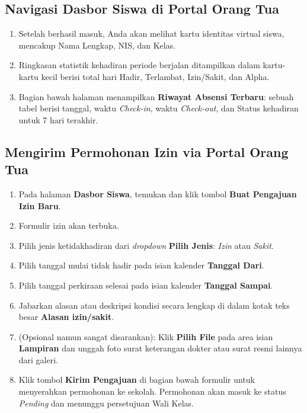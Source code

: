 \subsection{Navigasi Dasbor Siswa di Portal Orang Tua}
\begin{enumerate}
    \item Setelah berhasil masuk, Anda akan melihat kartu identitas virtual siswa, mencakup Nama Lengkap, NIS, dan Kelas.
    \item Ringkasan statistik kehadiran periode berjalan ditampilkan dalam kartu-kartu kecil berisi total hari Hadir, Terlambat, Izin/Sakit, dan Alpha.
    \item Bagian bawah halaman menampilkan \textbf{Riwayat Absensi Terbaru}: sebuah tabel berisi tanggal, waktu \textit{Check-in}, waktu \textit{Check-out}, dan Status kehadiran untuk 7 hari terakhir.
\end{enumerate}

\subsection{Mengirim Permohonan Izin via Portal Orang Tua}
\begin{enumerate}
    \item Pada halaman \textbf{Dasbor Siswa}, temukan dan klik tombol \textbf{Buat Pengajuan Izin Baru}.
    \item Formulir izin akan terbuka.
    \item Pilih jenis ketidakhadiran dari \textit{dropdown} \textbf{Pilih Jenis}: \textit{Izin} atau \textit{Sakit}.
    \item Pilih tanggal mulai tidak hadir pada isian kalender \textbf{Tanggal Dari}.
    \item Pilih tanggal perkiraan selesai pada isian kalender \textbf{Tanggal Sampai}.
    \item Jabarkan alasan atau deskripsi kondisi secara lengkap di dalam kotak teks besar \textbf{Alasan izin/sakit}.
    \item (Opsional namun sangat disarankan): Klik \textbf{Pilih File} pada area isian \textbf{Lampiran} dan unggah foto surat keterangan dokter atau surat resmi lainnya dari galeri.
    \item Klik tombol \textbf{Kirim Pengajuan} di bagian bawah formulir untuk menyerahkan permohonan ke sekolah. Permohonan akan masuk ke status \textit{Pending} dan menunggu persetujuan Wali Kelas.
\end{enumerate}

